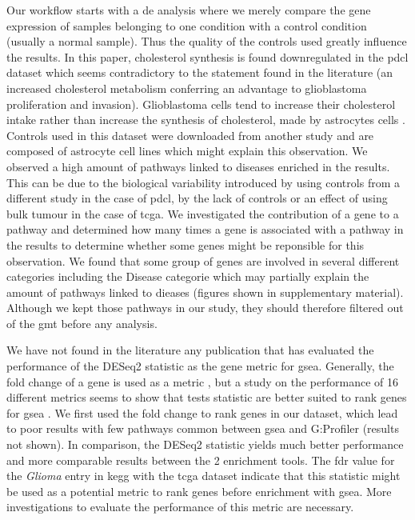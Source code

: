 Our workflow starts with a \acrlong{de} analysis where we merely compare the gene expression of samples belonging to one condition with a control condition (usually a normal sample).
Thus the quality of the controls used greatly influence the results.
In this paper, cholesterol synthesis is found downregulated in the \acrshort{pdcl} dataset which seems contradictory to the statement found in the literature (an increased cholesterol metabolism conferring an advantage to glioblastoma proliferation and invasion).
Glioblastoma cells tend to increase their cholesterol intake rather than increase the synthesis of cholesterol, made by astrocytes cells \cite*{Villa2016, Pirmoradi2019}.
Controls used in this dataset were downloaded from another study and are composed of astrocyte cell lines which might explain this observation.
We observed a high amount of pathways linked to diseases enriched in the results.
This can be due to the biological variability introduced by using controls from a different study in the case of \acrshort{pdcl}, by the lack of controls or an effect of using bulk tumour in the case of \acrshort{tcga}.
We investigated the contribution of a gene to a pathway and determined how many times a gene is associated with a pathway in the results to determine whether some genes might be reponsible for this observation.
We found that some group of genes are involved in several different categories including the Disease categorie which may partially explain the amount of pathways linked to dieases (figures shown in supplementary material).
Although we kept those pathways in our study, they should therefore filtered out of the \acrshort{gmt} before any analysis.

We have not found in the literature any publication that has evaluated the performance of the DESeq2 statistic as the gene metric for \acrshort{gsea}.
Generally, the fold change of a gene is used as a metric \cite*{Reimand2019}, but a study on the performance of 16 different metrics seems to show that tests statistic are better suited to rank genes for \acrshort{gsea} \cite*{Zyla2017}.
We first used the fold change to rank genes in our dataset, which lead to poor results with few pathways common between \acrshort{gsea} and G:Profiler (results not shown).
In comparison, the DESeq2 statistic yields much better performance and more comparable results between the 2 enrichment tools.
The \acrshort{fdr} value for the \textit{Glioma} entry in \acrshort{kegg} with the \acrshort{tcga} dataset indicate that this statistic might be used as a potential metric to rank genes before enrichment with \acrshort{gsea}.
More investigations to evaluate the performance of this metric are necessary.

